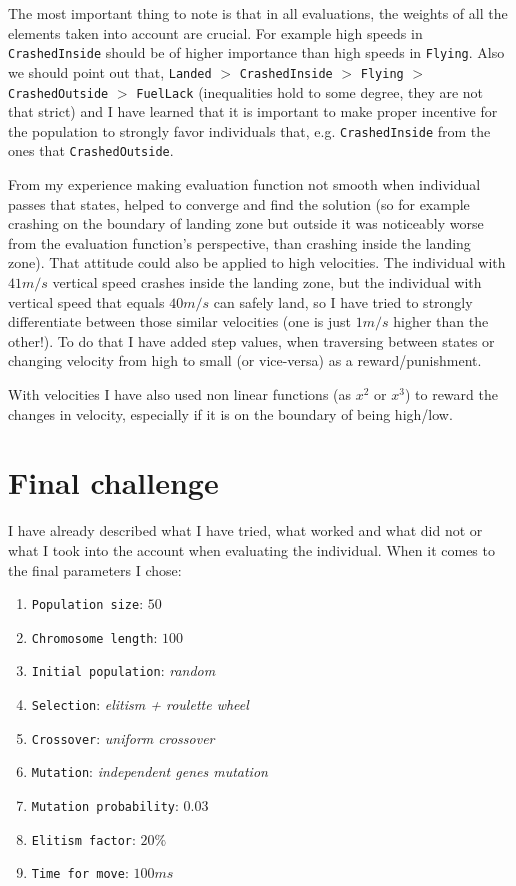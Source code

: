 \documentclass[11pt]{article}
\begin{document}
	The most important thing to note is that in all evaluations, the weights of all the elements taken into account are crucial. For example high speeds in \texttt{CrashedInside} should be of higher importance than high speeds in \texttt{Flying}. Also we should point out that, \texttt{Landed} $>$ \texttt{CrashedInside} $>$ \texttt{Flying} $>$ \texttt{CrashedOutside} $>$ \texttt{FuelLack} (inequalities hold to some degree, they are not that strict) and I have learned that it is important to make proper incentive for the population to strongly favor individuals that, e.g. \texttt{CrashedInside} from the ones that \texttt{CrashedOutside}. 
	
	From my experience making evaluation function not smooth when individual passes that states, helped to converge and find the solution (so for example crashing on the boundary of landing zone but outside it was noticeably worse from the evaluation function's perspective, than crashing inside the landing zone). That attitude could also be applied to high velocities. The individual with $41m/s$ vertical speed crashes inside the landing zone, but the individual with vertical speed that equals $40m/s$ can safely land, so I have tried to strongly differentiate between those similar velocities (one is just $1m/s$ higher than the other!). To do that I have added step values, when traversing between states or changing velocity from high to small (or vice-versa) as a reward/punishment.
	
	With velocities I have also used non linear functions (as $x^2$ or $x^3$) to reward the changes in velocity, especially if it is on the boundary of being high/low.
	
	\section{Final challenge}
	I have already described what I have tried, what worked and what did not or what I took into the account when evaluating the individual. When it comes to the final parameters I chose:
	\begin{enumerate}
		\item[] \texttt{Population size}: $50$
		\item[] \texttt{Chromosome length}: $100$
		\item[] \texttt{Initial population}: \textit{random}
		\item[] \texttt{Selection}: \textit{elitism + roulette wheel}
		\item[] \texttt{Crossover}: \textit{uniform crossover}
		\item[] \texttt{Mutation}: \textit{independent genes mutation}
		\item[] \texttt{Mutation probability}: $0.03$
		\item[] \texttt{Elitism factor}: $20\%$
		\item[] \texttt{Time for move}: $100ms$
	\end{enumerate}
	
\end{document}
